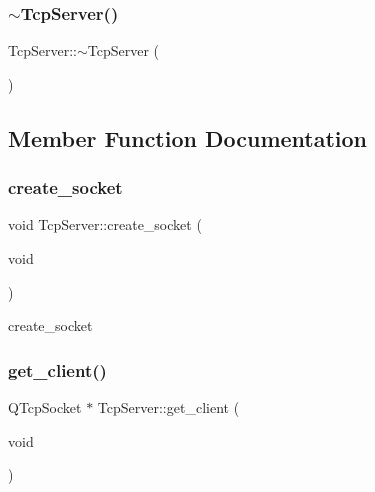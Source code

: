 \mbox{\label{class_tcp_server_a728a9e31c53cf86887f1f6149b1c46dd}} 
\subsubsection{\texorpdfstring{$\sim$TcpServer()}{~TcpServer()}}
{\footnotesize\ttfamily Tcp\+Server\+::$\sim$\+Tcp\+Server (\begin{DoxyParamCaption}{ }\end{DoxyParamCaption})}



\subsection{Member Function Documentation}
\mbox{\label{class_tcp_server_a90ee8945eb2ceec552f5f7a850fd9dce}} 
\subsubsection{\texorpdfstring{create\_socket}{create\_socket}}
{\footnotesize\ttfamily void Tcp\+Server\+::create\+\_\+socket (\begin{DoxyParamCaption}\item[{void}]{ }\end{DoxyParamCaption})\hspace{0.3cm}{\ttfamily [slot]}}



create\+\_\+socket 

\mbox{\label{class_tcp_server_a321f1064fd590efdeb1f9458b89afdca}} 
\subsubsection{\texorpdfstring{get\_client()}{get\_client()}}
{\footnotesize\ttfamily Q\+Tcp\+Socket $\ast$ Tcp\+Server\+::get\+\_\+client (\begin{DoxyParamCaption}\item[{void}]{ }\end{DoxyParamCaption})}



